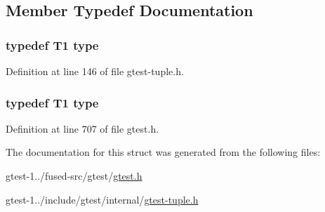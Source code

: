 \subsection{\-Member \-Typedef \-Documentation}
\hypertarget{structstd_1_1tr1_1_1gtest__internal_1_1TupleElement_3_01true_00_011_00_01GTEST__10__TUPLE___07T_08_4_a8628f95f627e63dcdb1268870410d6ab}{
\subsubsection[{type}]{\setlength{\rightskip}{0pt plus 5cm}typedef \-T1 {\bf type}}}\label{d3/df2/structstd_1_1tr1_1_1gtest__internal_1_1TupleElement_3_01true_00_011_00_01GTEST__10__TUPLE___07T_08_4_a8628f95f627e63dcdb1268870410d6ab}


\-Definition at line 146 of file gtest-\/tuple.\-h.

\hypertarget{structstd_1_1tr1_1_1gtest__internal_1_1TupleElement_3_01true_00_011_00_01GTEST__10__TUPLE___07T_08_4_a8628f95f627e63dcdb1268870410d6ab}{
\subsubsection[{type}]{\setlength{\rightskip}{0pt plus 5cm}typedef \-T1 {\bf type}}}\label{d3/df2/structstd_1_1tr1_1_1gtest__internal_1_1TupleElement_3_01true_00_011_00_01GTEST__10__TUPLE___07T_08_4_a8628f95f627e63dcdb1268870410d6ab}


\-Definition at line 707 of file gtest.\-h.



\-The documentation for this struct was generated from the following files\-:\begin{DoxyCompactItemize}
\item 
gtest-\/1../fused-\/src/gtest/\hyperlink{fused-src_2gtest_2gtest_8h}{gtest.\-h}\item 
gtest-\/1../include/gtest/internal/\hyperlink{gtest-tuple_8h}{gtest-\/tuple.\-h}\end{DoxyCompactItemize}
